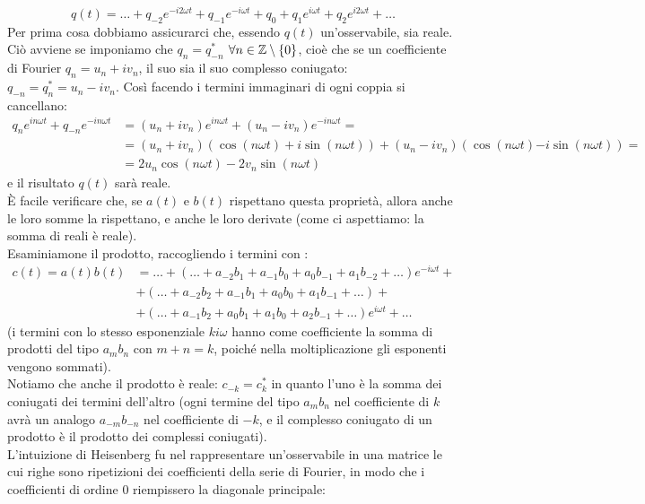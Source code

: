 \documentclass[FisicaTeorica.tex]{subfiles}
\begin{document}
\[
q(t) = \dots + q_{-2}e^{-i2\omega t} + q_{-1}e^{-i\omega t} + q_0 + q_1 e^{i\omega t} + q_2 e^{i2\omega t} + \dots
\]
Per prima cosa dobbiamo assicurarci che, essendo $q(t)$ un'osservabile, sia reale. Ciò avviene se imponiamo che $q_n = q_{-n}^*$ $\forall n\in \mathbb{Z}\setminus\{0\}$, cioè che se un coefficiente di Fourier $q_n = u_n + iv_n$, il suo  sia il suo complesso coniugato: $q_{-n} = q_{n}^* = u_n - iv_n$. Così facendo i termini immaginari di ogni coppia si cancellano:
\begin{align*}
q_n e^{in\omega t} + q_{-n}e^{-in\omega t} &= (u_n + iv_n)e^{in\omega t} + (u_n - iv_n)e^{-in\omega t} =\\
&= (u_n + iv_n)(\cos(n\omega t)+i\sin(n\omega t)) + (u_n-iv_n)(\cos(n\omega t) \bm{-} i\sin(n\omega t)) =\\
&= 2u_n\cos(n\omega t)-2v_n\sin(n\omega t)
\end{align*}
e il risultato $q(t)$ sarà reale.\\
È facile verificare che, se $a(t)$ e $b(t)$ rispettano questa proprietà, allora anche le loro somme la rispettano, e anche le loro derivate (come ci aspettiamo: la somma di reali è reale).\\
Esaminiamone il prodotto, raccogliendo i termini con :
\begin{align*}
c(t) = a(t)b(t) &= \dots + (\dots +a_{-2}b_1 + a_{-1}b_0 + a_0 b_{-1} + a_1 b_{-2} + \dots )e^{-i\omega t} +\\
&+ (\dots +a_{-2}b_2 + a_{-1}b_1 + a_0 b_0 + a_1 b_{-1} + \dots ) + \\
&+ (\dots +a_{-1}b_2 + a_{0}b_1 + a_1 b_{0} + a_2 b_{-1} + \dots ) e^{i\omega t} + \dots
\end{align*}
(i termini con lo stesso esponenziale $ki\omega$ hanno come coefficiente la somma di prodotti del tipo $a_m b_n$ con $m+n=k$, poiché nella moltiplicazione gli esponenti vengono sommati).\\
Notiamo che anche il prodotto è reale: $c_{-k} = c_k^*$ in quanto l'uno è la somma dei coniugati dei termini dell'altro (ogni termine del tipo $a_m b_n$ nel coefficiente di $k$ avrà un analogo $a_{-m}b_{-n}$ nel coefficiente di $-k$, e il complesso coniugato di un prodotto è il prodotto dei complessi coniugati).\\
L'intuizione di Heisenberg fu nel rappresentare un'osservabile in una matrice le cui righe sono ripetizioni  dei coefficienti della serie di Fourier, in modo che i coefficienti di ordine $0$ riempissero la diagonale principale:
\end{document}
